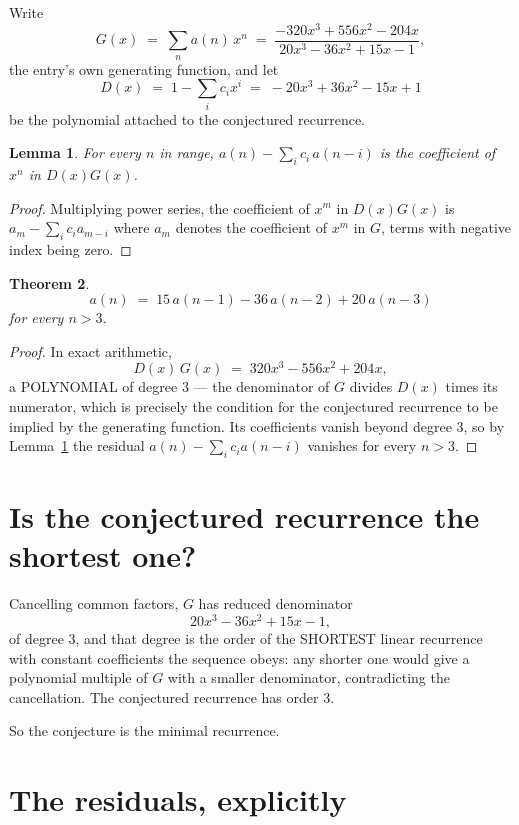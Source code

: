 \documentclass[11pt,a4paper]{article}
\theoremstyle{plain}
\newtheorem{theorem}{Theorem}
\newtheorem{lemma}[theorem]{Lemma}
\theoremstyle{definition}
\begin{document}
Write
\[
G(x)\;=\;\sum_{n}a(n)\,x^{n}\;=\;\frac{- 320 x^{3} + 556 x^{2} - 204 x}{20 x^{3} - 36 x^{2} + 15 x - 1},
\]
the entry's own generating function, and let
\[
D(x)\;=\;1-\sum_i c_i x^{i}\;=\;- 20 x^{3} + 36 x^{2} - 15 x + 1
\]
be the polynomial attached to the conjectured recurrence.

\begin{lemma}\label{lem:key}
For every $n$ in range, $a(n)-\sum_i c_i\,a(n-i)$ is the coefficient of $x^{n}$ in
$D(x)G(x)$.
\end{lemma}

\begin{proof}
Multiplying power series, the coefficient of $x^{m}$ in $D(x)G(x)$ is
$a_m-\sum_i c_i a_{m-i}$ where $a_m$ denotes the coefficient of $x^{m}$ in $G$, terms with
negative index being zero.
\end{proof}

\begin{theorem}
\[
a(n)\;=\;15\,a(n-1) - 36\,a(n-2) + 20\,a(n-3)
\]
for every $n>3$.
\end{theorem}

\begin{proof}
In exact arithmetic,
\[
D(x)\,G(x)\;=\;320 x^{3} - 556 x^{2} + 204 x,
\]
a POLYNOMIAL of degree $3$ --- the denominator of $G$ divides $D(x)$ times its numerator,
which is precisely the condition for the conjectured recurrence to be implied by the
generating function. Its coefficients vanish beyond degree $3$, so by
Lemma~\ref{lem:key} the residual $a(n)-\sum_ic_ia(n-i)$ vanishes for every
$n>3$.
\end{proof}

\section{Is the conjectured recurrence the shortest one?}

Cancelling common factors, $G$ has reduced denominator
\[
20 x^{3} - 36 x^{2} + 15 x - 1,
\]
of degree $3$, and that degree is the order of the SHORTEST linear recurrence with
constant coefficients the sequence obeys: any shorter one would give a polynomial multiple of
$G$ with a smaller denominator, contradicting the cancellation. The conjectured recurrence has
order $3$.

So the conjecture is the minimal recurrence.

\section{The residuals, explicitly}
\end{document}
